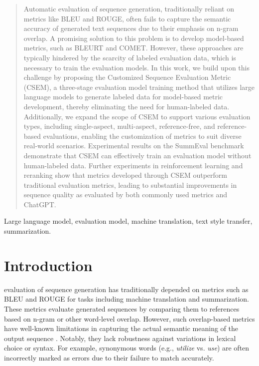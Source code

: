 \documentclass[lettersize,journal]{IEEEtran}
\begin{document}
\begin{abstract}
Automatic evaluation of sequence generation, traditionally reliant on metrics like BLEU and ROUGE, often fails to capture the semantic accuracy of generated text sequences due to their emphasis on n-gram overlap. A promising solution to this problem is to develop model-based metrics, such as BLEURT and COMET. However, these approaches are typically hindered by the scarcity of labeled evaluation data, which is necessary to train the evaluation models. In this work, we build upon this challenge by proposing the Customized Sequence Evaluation Metric (CSEM), a three-stage evaluation model training method that utilizes large language models to generate labeled data for model-based metric development, thereby eliminating the need for human-labeled data. Additionally, we expand the scope of CSEM to support various evaluation types, including single-aspect, multi-aspect, reference-free, and reference-based evaluations, enabling the customization of metrics to suit diverse real-world scenarios. Experimental results on the SummEval benchmark demonstrate that CSEM can effectively train an evaluation model without human-labeled data. Further experiments in reinforcement learning and reranking show that metrics developed through CSEM outperform traditional evaluation metrics, leading to substantial improvements in sequence quality as evaluated by both commonly used metrics and ChatGPT.
\end{abstract}

\begin{IEEEkeywords}
Large language model, evaluation model, machine translation, text style transfer, summarization.
\end{IEEEkeywords}

\section{Introduction}
 evaluation of sequence generation has traditionally depended on metrics such as BLEU \cite{papineni2002bleu} and ROUGE \cite{lin2004rouge} for tasks including machine translation and summarization. These metrics evaluate generated sequences by comparing them to references based on n-gram or other word-level overlap. However, such overlap-based metrics have well-known limitations in capturing the actual semantic meaning of the output sequence \cite{zhang2019bertscore,wieting2019beyond,sellam2020bleurt}. Notably, they lack robustness against variations in lexical choice or syntax. For example, synonymous words (e.g., \textit{utilize} vs. \textit{use}) are often incorrectly marked as errors due to their failure to match accurately.
\end{document}
